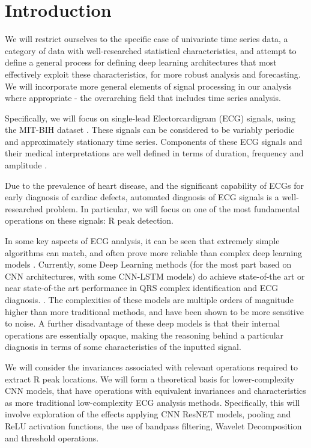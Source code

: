 \documentclass[9pt,conference]{IEEEtran}
\begin{document}
\section{Introduction}
We will restrict ourselves to the specific case of univariate time series data, a category of data with well-researched statistical characteristics, and attempt to define a general process for defining deep learning architectures that most effectively exploit these characteristics, for more robust analysis and forecasting. We will incorporate more general elements of signal processing in our analysis where appropriate - the overarching field that includes time series analysis. 

Specifically, we will focus on single-lead Electorcardigram (ECG) signals, using the MIT-BIH dataset \cite{dataset}. These signals can be considered to be variably periodic and approximately stationary time series. Components of these ECG signals and their medical interpretations are well defined in terms of duration, frequency and amplitude \cite{cardioBook}. 

Due to the prevalence of heart disease, and the significant capability of ECGs for early diagnosis of cardiac defects, automated diagnosis of ECG signals is a well-researched problem. In particular, we will focus on one of the most fundamental operations on these signals: R peak detection.

In some key aspects of ECG analysis, it can be seen that extremely simple algorithms can match, and often prove more reliable than complex deep learning models \cite{ecgReview}. Currently, some Deep Learning methods (for the most part based on CNN architectures, with some CNN-LSTM models) do achieve state-of-the art or near state-of-the art performance in QRS complex identification and ECG diagnosis. \cite{dlECGReview}. The complexities of these models are multiple orders of magnitude higher than more traditional methods, and have been shown to be more sensitive to noise. A further disadvantage of these deep models is that their internal operations are essentially opaque, making the reasoning behind a particular diagnosis in terms of some characteristics of the inputted signal.

We will consider the invariances \cite{invariants}\cite{invariantsWithDNN} associated with relevant operations required to extract R peak locations. We will form a theoretical basis for lower-complexity CNN models, that have operations with equivalent invariances and characteristics as more traditional low-complexity ECG analysis methods. Specifically, this will involve exploration of the effects applying CNN ResNET models, pooling and ReLU activation functions,  the use of bandpass filtering, Wavelet Decomposition \cite{despawn} and threshold operations.
\end{document}
